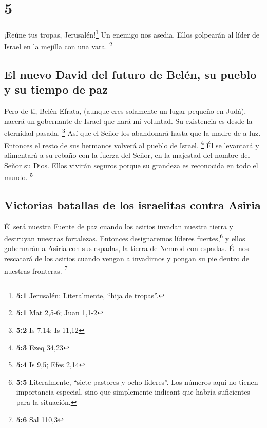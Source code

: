 \hypertarget{section-4}{%
\section{5}\label{section-4}}

 ¡Reúne tus tropas, Jerusalén!\footnote{\textbf{5:1}
  Jerusalén: Literalmente, ``hija de tropas''.} Un enemigo nos asedia.
Ellos golpearán al líder de Israel en la mejilla con una vara.
\footnote{\textbf{5:1} Mat 2,5-6; Juan 1,1-2}

\hypertarget{el-nuevo-david-del-futuro-de-beluxe9n-su-pueblo-y-su-tiempo-de-paz}{%
\subsection{El nuevo David del futuro de Belén, su pueblo y su tiempo de
paz}\label{el-nuevo-david-del-futuro-de-beluxe9n-su-pueblo-y-su-tiempo-de-paz}}

 Pero de ti, Belén Efrata, (aunque eres solamente un lugar
pequeño en Judá), nacerá un gobernante de Israel que hará mi voluntad.
Su existencia es desde la eternidad pasada. \footnote{\textbf{5:2} Is
  7,14; Is 11,12}  Así que el Señor los abandonará hasta
que la madre de a luz. Entonces el resto de sus hermanos volverá al
pueblo de Israel. \footnote{\textbf{5:3} Ezeq 34,23}  Él
se levantará y alimentará a su rebaño con la fuerza del Señor, en la
majestad del nombre del Señor su Dios. Ellos vivirán seguros porque su
grandeza es reconocida en todo el mundo. \footnote{\textbf{5:4} Is 9,5;
  Efes 2,14}

\hypertarget{victorias-batallas-de-los-israelitas-contra-asiria}{%
\subsection{Victorias batallas de los israelitas contra
Asiria}\label{victorias-batallas-de-los-israelitas-contra-asiria}}

 Él será nuestra Fuente de paz cuando los asirios invadan
nuestra tierra y destruyan nuestras fortalezas. Entonces designaremos
líderes fuertes,\footnote{\textbf{5:5} Literalmente, ``siete pastores y
  ocho líderes''. Los números aquí no tienen importancia especial, sino
  que simplemente indicant que habría suficientes para la situación.}
 y ellos gobernarán a Asiria con sus espadas, la tierra de
Nemrod con espadas. Él nos rescatará de los asirios cuando vengan a
invadirnos y pongan su pie dentro de nuestras fronteras. \footnote{\textbf{5:6}
  Sal 110,3}

